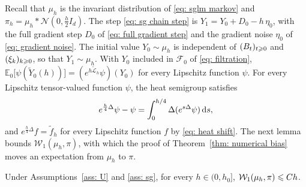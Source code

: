 Recall that $\mu_h$ is the invariant distribution of \eqref{eq: sglm markov} and $\pi_h = \mu_h * \mathcal N(0, \frac h2 I_d)$.
The step \eqref{eq: sg chain step} is $Y_1 = Y_0 + D_0 - h\, \eta_0$, with the full gradient step $D_0$ of \eqref{eq: full gradient step} and the gradient noise $\eta_0$ of \eqref{eq: gradient noise}.
The initial value $Y_0 \sim \mu_h$ is independent of $(B_t)_{t \geqslant 0}$ and $(\xi_k)_{k \geqslant 0}$, so that $Y_1 \sim \mu_h$. With $Y_0$ included in $\mathcal F_0$ of \eqref{eq: filtration}, $\mathbb E_0\bigl[ \psi(\tilde Y_0(h)) \bigr] = (e^{h\tilde{\mathcal L}_h} \psi)(Y_0)$ for every Lipschitz function $\psi$. For every Lipschitz tensor-valued function $\psi$, the heat semigroup satisfies
\begin{equation}
    e^{\frac h4 \Delta} \psi - \psi = \int_0^{h/4} \Delta ( e^{s\Delta} \psi )\, \mathrm{d} s ,
    \label{eq: heat shift integral}
\end{equation}
and $e^{\frac h4 \Delta} f = \tilde f_h$ for every Lipschitz function $f$ by \eqref{eq: heat shift}. The next lemma bounds $\mathcal W_1(\mu_h, \pi)$, with which the proof of Theorem~\ref{thm: numerical bias} moves an expectation from $\mu_h$ to $\pi$.

\begin{lemma}
\label{lem: rough}
    Under Assumptions~\ref{ass: U} and \ref{ass: sg}, for every $h \in (0,h_0]$, $\mathcal W_1(\mu_h, \pi) \leqslant C h$.
\end{lemma}

